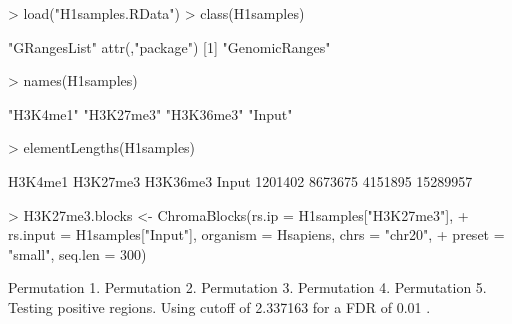 \begin{Schunk}
\begin{Sinput}
> load("H1samples.RData")
> class(H1samples)
\end{Sinput}
\begin{Soutput}
[1] "GRangesList"
attr(,"package")
[1] "GenomicRanges"
\end{Soutput}
\begin{Sinput}
> names(H1samples)
\end{Sinput}
\begin{Soutput}
[1] "H3K4me1"  "H3K27me3" "H3K36me3" "Input"   
\end{Soutput}
\begin{Sinput}
> elementLengths(H1samples)
\end{Sinput}
\begin{Soutput}
 H3K4me1 H3K27me3 H3K36me3    Input 
 1201402  8673675  4151895 15289957 
\end{Soutput}
\begin{Sinput}
> H3K27me3.blocks <- ChromaBlocks(rs.ip = H1samples["H3K27me3"], 
+     rs.input = H1samples["Input"], organism = Hsapiens, chrs = "chr20", 
+     preset = "small", seq.len = 300)
\end{Sinput}
\begin{Soutput}
Permutation 1.
Permutation 2.
Permutation 3.
Permutation 4.
Permutation 5.
Testing positive regions.
Using cutoff of 2.337163 for a FDR of 0.01 
.
\end{Soutput}
\end{Schunk}
